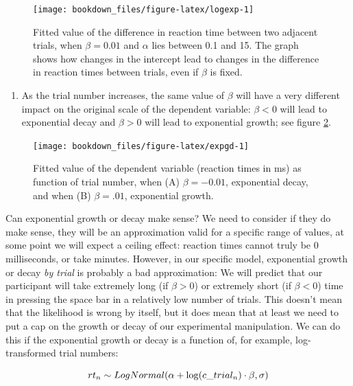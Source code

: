 \documentclass[12pt,]{krantz}
\providecommand{\tightlist}{%
  \setlength{\itemsep}{0pt}\setlength{\parskip}{0pt}}
\theoremstyle{definition}
\theoremstyle{definition}
\theoremstyle{definition}
\theoremstyle{remark}
\begin{document}
\begin{figure}[H]
  \texttt{[image: bookdown\_files/figure-latex/logexp-1]} \caption{Fitted value of the difference in reaction time between two adjacent trials, when \(\beta=0.01\) and \(\alpha\) lies between 0.1 and 15. The graph shows how changes in the intercept lead to changes in the difference in reaction times between trials, even if \(\beta\) is fixed.}\label{fig:logexp}
  \end{figure}

\begin{enumerate}
\def\labelenumi{\arabic{enumi}.}
\setcounter{enumi}{1}
\tightlist
\item
  As the trial number increases, the same value of \(\beta\) will have a very different impact on the original scale of the dependent variable: \(\beta <0\) will lead to exponential decay and \(\beta >0\) will lead to exponential growth; see figure \ref{fig:expgd}.
\end{enumerate}



\begin{figure}[H]
\texttt{[image: bookdown\_files/figure-latex/expgd-1]} \caption{Fitted value of the dependent variable (reaction times in ms) as function of trial number, when (A) \(\beta = -0.01\), exponential decay, and when (B) \(\beta =.01\), exponential growth.}\label{fig:expgd}
\end{figure}

Can exponential growth or decay make sense? We need to consider if they do make sense, they will be an approximation valid for a specific range of values, at some point we will expect a ceiling effect: reaction times cannot truly be 0 milliseconds, or take minutes. However, in our specific model, exponential growth or decay \emph{by trial} is probably a bad approximation: We will predict that our participant will take extremely long (if \(\beta >0\)) or extremely short (if \(\beta <0\)) time in pressing the space bar in a relatively low number of trials. This doesn't mean that the likelihood is wrong by itself, but it does mean that at least we need to put a cap on the growth or decay of our experimental manipulation. We can do this if the exponential growth or decay is a function of, for example, log-transformed trial numbers:

\begin{equation}
rt_n \sim LogNormal(\alpha + \log(c\_trial_n) \cdot \beta,\sigma)\\
\end{equation}
\end{document}
